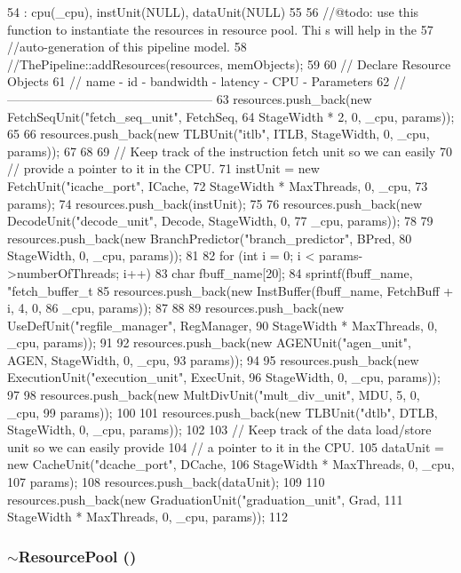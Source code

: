 \begin{DoxyCode}
54     : cpu(_cpu), instUnit(NULL), dataUnit(NULL)
55 {
56     //@todo: use this function to instantiate the resources in resource pool. Thi
      s will help in the
57     //auto-generation of this pipeline model.
58     //ThePipeline::addResources(resources, memObjects);
59 
60     // Declare Resource Objects
61     // name - id - bandwidth - latency - CPU - Parameters
62     // --------------------------------------------------
63     resources.push_back(new FetchSeqUnit("fetch_seq_unit", FetchSeq,
64             StageWidth * 2, 0, _cpu, params));
65 
66     resources.push_back(new TLBUnit("itlb", ITLB, StageWidth, 0, _cpu, params));
67 
68 
69     // Keep track of the instruction fetch unit so we can easily
70     // provide a pointer to it in the CPU.
71     instUnit = new FetchUnit("icache_port", ICache,
72                              StageWidth * MaxThreads, 0, _cpu,
73                              params);
74     resources.push_back(instUnit);
75 
76     resources.push_back(new DecodeUnit("decode_unit", Decode, StageWidth, 0,
77             _cpu, params));
78 
79     resources.push_back(new BranchPredictor("branch_predictor", BPred,
80             StageWidth, 0, _cpu, params));
81 
82     for (int i = 0; i < params->numberOfThreads; i++) {
83         char fbuff_name[20];
84         sprintf(fbuff_name, "fetch_buffer_t%
85         resources.push_back(new InstBuffer(fbuff_name, FetchBuff + i, 4, 0,
86                 _cpu, params));
87     }
88 
89     resources.push_back(new UseDefUnit("regfile_manager", RegManager,
90             StageWidth * MaxThreads, 0, _cpu, params));
91 
92     resources.push_back(new AGENUnit("agen_unit", AGEN, StageWidth, 0, _cpu,
93             params));
94 
95     resources.push_back(new ExecutionUnit("execution_unit", ExecUnit,
96             StageWidth, 0, _cpu, params));
97 
98     resources.push_back(new MultDivUnit("mult_div_unit", MDU, 5, 0, _cpu,
99             params));
100 
101     resources.push_back(new TLBUnit("dtlb", DTLB, StageWidth, 0, _cpu, params));
102 
103     // Keep track of the data load/store unit so we can easily provide
104     // a pointer to it in the CPU.
105     dataUnit = new CacheUnit("dcache_port", DCache,
106                              StageWidth * MaxThreads, 0, _cpu,
107                              params);
108     resources.push_back(dataUnit);
109 
110     resources.push_back(new GraduationUnit("graduation_unit", Grad,
111             StageWidth * MaxThreads, 0, _cpu, params));
112 }
\end{DoxyCode}
\hypertarget{classResourcePool_acba0a0d37ec0b89303d390cdb9e372cf}{
\subsubsection[{$\sim$ResourcePool}]{\setlength{\rightskip}{0pt plus 5cm}$\sim${\bf ResourcePool} ()}}
\label{classResourcePool_acba0a0d37ec0b89303d390cdb9e372cf}



